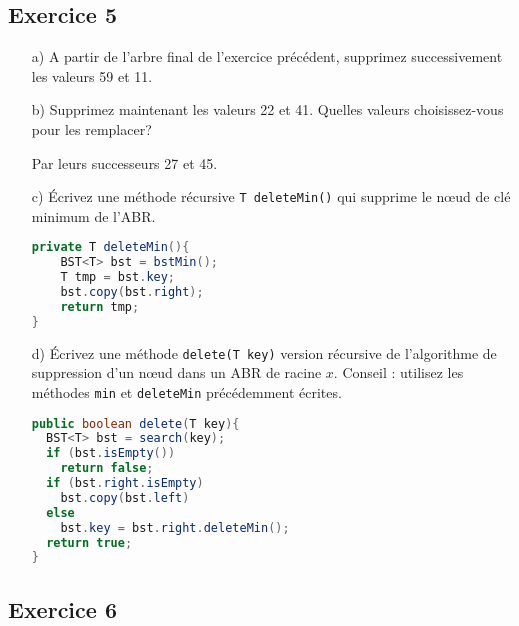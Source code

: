 \documentclass[iutinfo,a4paper,10pt]{ustl-tdtp}
\begin{document}
\subsection*{Exercice 5}

\begin{enumerate}
\item [a)] A partir de l'arbre final de l'exercice précédent, supprimez successivement les valeurs 59 et 11. 
\item [b)] Supprimez maintenant les valeurs 22 et 41. Quelles valeurs choisissez-vous pour les remplacer? 

\begin{solution}
{\color{red}
Par leurs successeurs 27 et 45.
}
\end{solution}

\item [c)]  Écrivez une méthode récursive \texttt{T deleteMin()} qui supprime le n\oe ud de clé minimum de l'ABR.

\begin{solution}
{\color{red}
\begin{lstlisting}[language=Java]
private T deleteMin(){
    BST<T> bst = bstMin();
    T tmp = bst.key;
    bst.copy(bst.right);
    return tmp;
}

\end{lstlisting}
}
\end{solution}


\item [d)] Écrivez une méthode \texttt{delete(T key)}
  version récursive de l'algorithme de suppression d'un n\oe ud dans un ABR de racine $x$. Conseil : utilisez les méthodes \texttt{min} et \texttt{deleteMin} précédemment écrites.

\begin{solution}
{\color{red}
\begin{lstlisting}[language=Java]
public boolean delete(T key){
  BST<T> bst = search(key);
  if (bst.isEmpty())
    return false;
  if (bst.right.isEmpty)
    bst.copy(bst.left)
  else
    bst.key = bst.right.deleteMin();
  return true;
}

\end{lstlisting}
}
\end{solution}
\end{enumerate}

\subsection*{Exercice 6}
\end{document}
